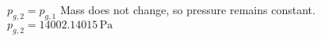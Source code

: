 \( p_{g,2} = p_{g,1} \)  
Mass does not change, so pressure remains constant.  
\( p_{g,2} = 14002.14015 \, \text{Pa} \)